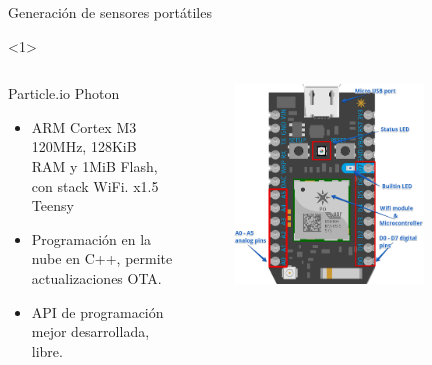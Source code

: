 \begin{frame}{Generación de sensores portátiles}
    \begin{onlyenv}<1>
        \begin{columns}[c]
            \begin{column}{.5\textwidth}
            Particle.io Photon
            \begin{itemize}
                \item ARM Cortex M3 120MHz, 128KiB RAM y 1MiB Flash, con stack WiFi. x1.5 Teensy
                \item Programación en la nube en C++, permite actualizaciones OTA.
                \item API de programación mejor desarrollada, libre.
            \end{itemize}
            \end{column}

            \begin{column}{.5\textwidth}
                \vspace{-2em}
                \begin{figure}
                    \includegraphics[width=0.8\textwidth]{fig/circuito/photon}
                    \label{fig:circuito/photon}
                \end{figure}
                
            \end{column}
        \end{columns}
    \end{onlyenv}


\end{frame}
